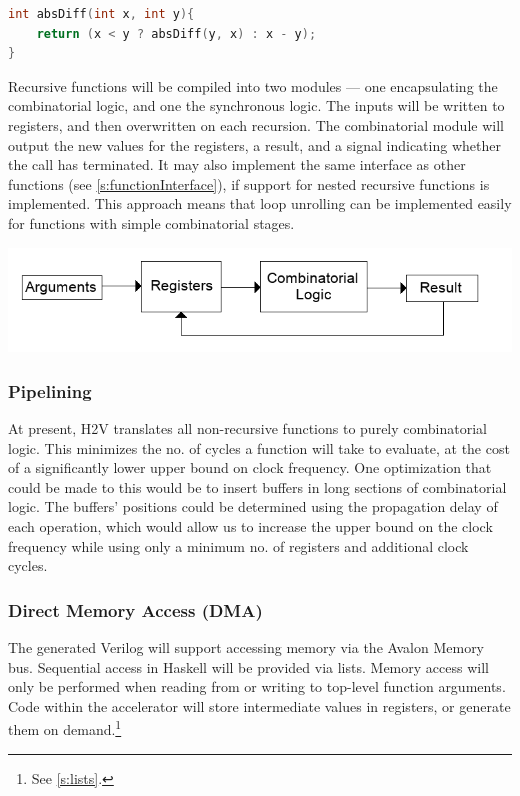 \documentclass[english,onecolumn]{article}
\begin{document}
\begin{lstlisting}[language=C, caption={An example of a tail-recursive function in C.}, label={lst:tailrec}]
int absDiff(int x, int y){
    return (x < y ? absDiff(y, x) : x - y);
}
\end{lstlisting}

Recursive functions will be compiled into two modules --- one encapsulating the combinatorial logic, and one the synchronous logic.
The inputs will be written to registers, and then overwritten on each recursion. The combinatorial module will output the new values for the registers, a result, and a signal indicating whether the call has terminated. It may also implement the same interface as other functions (see \ref{s:functionInterface}), if support for nested recursive functions is implemented.
This approach means that loop unrolling can be implemented easily for functions with simple combinatorial stages.

\includegraphics[scale=0.5]{./recursive.png}

\subsubsection{Pipelining}
At present, H2V translates all non-recursive functions to purely combinatorial logic. This minimizes the no. of cycles a function will take to evaluate, at the cost of a significantly lower upper bound on clock frequency. One optimization that could be made to this would be to insert buffers in long sections of combinatorial logic. The buffers' positions could be determined using the propagation delay of each operation, which would allow us to increase the upper bound on the clock frequency while using only a minimum no. of registers and additional clock cycles.

\subsubsection{Direct Memory Access (DMA)}
\label{s:DMA}
The generated Verilog will support accessing memory via the Avalon Memory bus. Sequential access in Haskell will be provided via lists.
Memory access will only be performed when reading from or writing to top-level function arguments. Code within the accelerator will store intermediate values in registers, or generate them on demand.\footnote{See \ref{s:lists}.}
\end{document}
